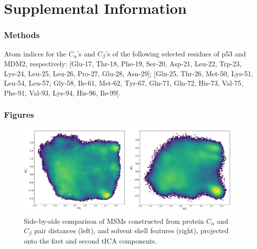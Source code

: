 


\section{Supplemental Information}


\subsubsection{Methods}
Atom indices for the $C_{\alpha}$'s and $C_{\beta}$'s of the following selected residues of p53 and MDM2, respectively: [Glu-17, Thr-18, Phe-19, Ser-20, Asp-21, Leu-22, Trp-23, Lys-24, Leu-25, Leu-26, Pro-27, Glu-28, Asn-29]; [Glu-25, Thr-26, Met-50, Lys-51, Leu-54, Leu-57, Gly-58, Ile-61, Met-62, Tyr-67, Gln-71, Gln-72, His-73, Val-75, Phe-91, Val-93, Lys-94, His-96, Ile-99].



\subsubsection{Figures}

\begin{figure}[h!]
\centering
\includegraphics[scale=0.75]{Figures/SI/tica_compare.pdf}
\caption{Side-by-side comparison of MSMs constructed from
protein $C_{\alpha}$ and $C_{\beta}$ pair distances (left), and solvent shell features
(right), projected onto the first and second tICA components.}
\label{fig:tica_compare}
\end{figure}



